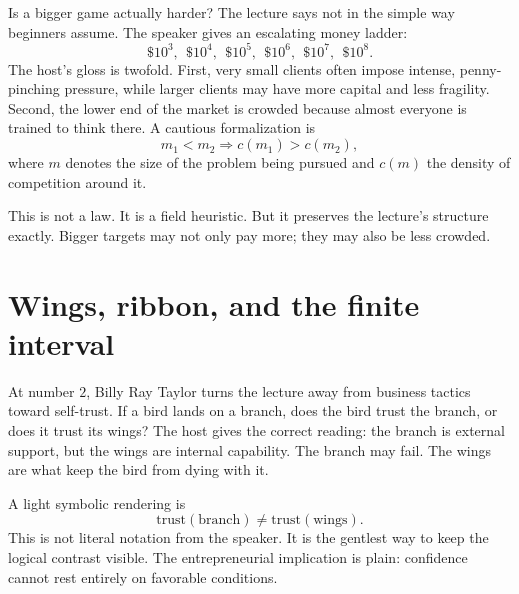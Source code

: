 Is a bigger game actually harder? The lecture says not in the simple way beginners assume. The speaker gives an escalating money ladder:
\begin{equation}
\$10^3,\ \ \$10^4,\ \ \$10^5,\ \ \$10^6,\ \ \$10^7,\ \ \$10^8.
\end{equation}
The host's gloss is twofold. First, very small clients often impose intense, penny-pinching pressure, while larger clients may have more capital and less fragility. Second, the lower end of the market is crowded because almost everyone is trained to think there. A cautious formalization is
\begin{equation}
m_1 < m_2 \Rightarrow c(m_1) > c(m_2),
\end{equation}
where \(m\) denotes the size of the problem being pursued and \(c(m)\) the density of competition around it.

This is not a law. It is a field heuristic. But it preserves the lecture's structure exactly. Bigger targets may not only pay more; they may also be less crowded.

\begin{figure}[h]
\centering
{}
\end{figure}

\section{Wings, ribbon, and the finite interval}

At number \(2\), Billy Ray Taylor turns the lecture away from business tactics toward self-trust. If a bird lands on a branch, does the bird trust the branch, or does it trust its wings? The host gives the correct reading: the branch is external support, but the wings are internal capability. The branch may fail. The wings are what keep the bird from dying with it.

A light symbolic rendering is
\begin{equation}
\mathrm{trust}(\mathrm{branch}) \neq \mathrm{trust}(\mathrm{wings}).
\end{equation}
This is not literal notation from the speaker. It is the gentlest way to keep the logical contrast visible. The entrepreneurial implication is plain: confidence cannot rest entirely on favorable conditions.

